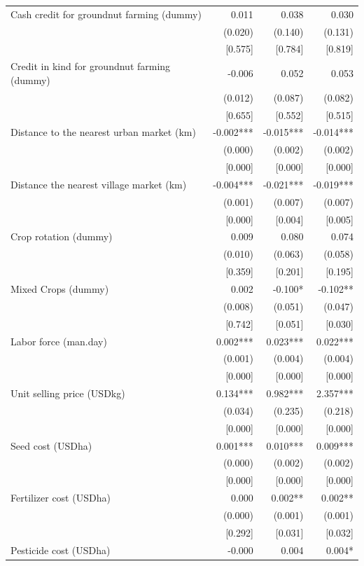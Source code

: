 \documentclass[
]{article}
\begin{document}
\begin{ThreePartTable}
\begin{longtable}[t]{lrrr}
Cash credit for groundnut farming (dummy) & 0.011 & 0.038 & 0.030\\
 & (0.020) & (0.140) & (0.131)\\
 & {}[0.575] & {}[0.784] & {}[0.819]\\
Credit in kind for groundnut farming (dummy) & -0.006 & 0.052 & 0.053\\
 & (0.012) & (0.087) & (0.082)\\
 & {}[0.655] & {}[0.552] & {}[0.515]\\
Distance to the nearest urban market (km) & -0.002*** & -0.015*** & -0.014***\\
 & (0.000) & (0.002) & (0.002)\\
 & {}[0.000] & {}[0.000] & {}[0.000]\\
Distance the nearest village market (km) & -0.004*** & -0.021*** & -0.019***\\
 & (0.001) & (0.007) & (0.007)\\
 & {}[0.000] & {}[0.004] & {}[0.005]\\
Crop rotation (dummy) & 0.009 & 0.080 & 0.074\\
 & (0.010) & (0.063) & (0.058)\\
 & {}[0.359] & {}[0.201] & {}[0.195]\\
Mixed Crops (dummy) & 0.002 & -0.100* & -0.102**\\
 & (0.008) & (0.051) & (0.047)\\
 & {}[0.742] & {}[0.051] & {}[0.030]\\
Labor force (man.day) & 0.002*** & 0.023*** & 0.022***\\
 & (0.001) & (0.004) & (0.004)\\
 & {}[0.000] & {}[0.000] & {}[0.000]\\
Unit selling price (USD\/kg) & 0.134*** & 0.982*** & 2.357***\\
 & (0.034) & (0.235) & (0.218)\\
 & {}[0.000] & {}[0.000] & {}[0.000]\\
Seed cost (USD\/ha) & 0.001*** & 0.010*** & 0.009***\\
 & (0.000) & (0.002) & (0.002)\\
 & {}[0.000] & {}[0.000] & {}[0.000]\\
Fertilizer cost (USD\/ha) & 0.000 & 0.002** & 0.002**\\
 & (0.000) & (0.001) & (0.001)\\
 & {}[0.292] & {}[0.031] & {}[0.032]\\
Pesticide cost (USD\/ha) & -0.000 & 0.004 & 0.004*\\

\end{longtable}
\end{ThreePartTable}
\end{document}

